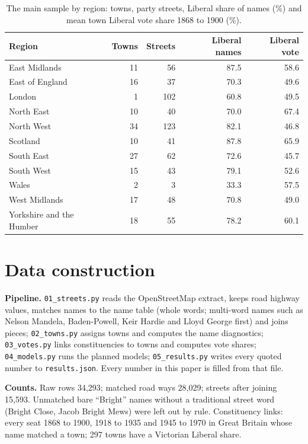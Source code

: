 \documentclass[11pt,a4paper]{article}
\begin{document}
\begin{table}[tbp]\centering\footnotesize\caption{The main sample by region: towns, party streets, Liberal share of names (\%) and mean town Liberal vote share 1868 to 1900 (\%).}\label{tab:region}\begin{tabular}{lrrrr}\toprule Region & Towns & Streets & Liberal names & Liberal vote\\\midrule
East Midlands & 11 & 56 & 87.5 & 58.6\\
East of England & 16 & 37 & 70.3 & 49.6\\
London & 1 & 102 & 60.8 & 49.5\\
North East & 10 & 40 & 70.0 & 67.4\\
North West & 34 & 123 & 82.1 & 46.8\\
Scotland & 10 & 41 & 87.8 & 65.9\\
South East & 27 & 62 & 72.6 & 45.7\\
South West & 15 & 43 & 79.1 & 52.6\\
Wales & 2 & 3 & 33.3 & 57.5\\
West Midlands & 17 & 48 & 70.8 & 49.0\\
Yorkshire and the Humber & 18 & 55 & 78.2 & 60.1\\
\bottomrule\end{tabular}\end{table}

\section{Data construction}
\textbf{Pipeline.} \texttt{01\_streets.py} reads the OpenStreetMap extract, keeps road highway values, matches names to the name table (whole words; multi-word names such as Nelson Mandela, Baden-Powell, Keir Hardie and Lloyd George first) and joins pieces; \texttt{02\_towns.py} assigns towns and computes the name diagnostics; \texttt{03\_votes.py} links constituencies to towns and computes vote shares; \texttt{04\_models.py} runs the planned models; \texttt{05\_results.py} writes every quoted number to \texttt{results.json}. Every number in this paper is filled from that file.

\textbf{Counts.} Raw rows 34,293; matched road ways 28,029; streets after joining 15,593. Unmatched bare ``Bright'' names without a traditional street word (Bright Close, Jacob Bright Mews) were left out by rule. Constituency links: every seat 1868 to 1900, 1918 to 1935 and 1945 to 1970 in Great Britain whose name matched a town; 297 towns have a Victorian Liberal share.
\end{document}
